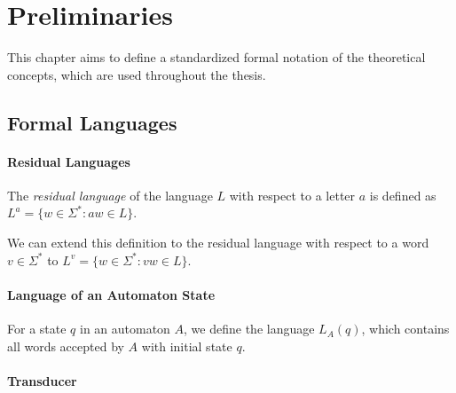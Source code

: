 \chapter{Preliminaries}\label{chapter:preliminaries}
This chapter aims to define a standardized formal notation of the theoretical concepts, which are used throughout the thesis.


\section{Formal Languages}

\subsubsection{Residual Languages}

The \emph{residual language} of the language $L$ with respect to a letter $a$ is defined as \break
$L^{a} = \{ w \in \Sigma^{*} : aw \in L \}$.

We can extend this definition to the residual language with respect to a word $v \in \Sigma^{*}$ to \break
$L^{v} = \{ w \in \Sigma^{*} : vw \in L \}$.

\subsubsection{Language of an Automaton State}

For a state $q$ in an automaton $A$, we define the language $L_{A}(q)$, which contains all words accepted by $A$ with initial state $q$.

\subsubsection{Transducer}


